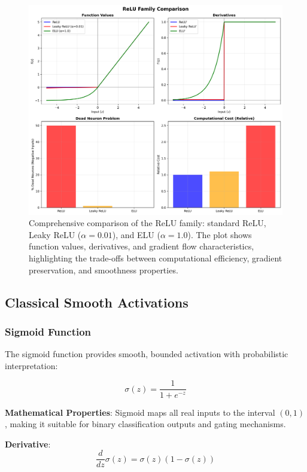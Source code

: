 \documentclass[11pt,a4paper]{report}
\begin{document}
\begin{figure}[H]
\centering
\includegraphics[width=\textwidth]{activation_relu_family.png}
\caption{Comprehensive comparison of the ReLU family: standard ReLU, Leaky ReLU ($\alpha=0.01$), and ELU ($\alpha=1.0$). The plot shows function values, derivatives, and gradient flow characteristics, highlighting the trade-offs between computational efficiency, gradient preservation, and smoothness properties.}
\label{fig:activation_relu_family}
\end{figure}

\subsection{Classical Smooth Activations}

\subsubsection{Sigmoid Function}

The sigmoid function provides smooth, bounded activation with probabilistic interpretation:

\begin{equation}
\sigma(z) = \frac{1}{1 + e^{-z}}
\end{equation}

\textbf{Mathematical Properties}: Sigmoid maps all real inputs to the interval $(0, 1)$, making it suitable for binary classification outputs and gating mechanisms.

\textbf{Derivative}: 
\begin{equation}
\frac{d}{dz}\sigma(z) = \sigma(z)(1 - \sigma(z))
\end{equation}
\end{document}
